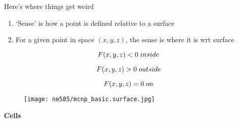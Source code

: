 \documentclass[aspectratio=1610,pdftex,dvipsnames,compress,xcolor={dvipsnames}]{beamer}
\begin{document}
\addtocounter{framenumber}{-1} 
\begin{frame}{Here's where things get weird}
    \begin{enumerate}[series=outerlist,topsep=0pt,itemsep=21pt,leftmargin=*,label=(\arabic*)]
        \item[]`Sense' is how a point is defined relative to a surface
        \item[]For a given point in space $(x,y,z)$, the sense is where it is wrt surface
    \end{enumerate}

    \vspace*{\fill}

    \begin{equation}
        \LARGE
        F(x,y,z) < 0 \; inside
    \end{equation}

    \begin{equation}
        \LARGE
        F(x,y,z) > 0 \; outside
    \end{equation}

    \begin{equation}
        \LARGE
        F(x,y,z) = 0 \; on
    \end{equation}
\end{frame}


\begin{frame}{}
    \begin{figure}
        \centering
        \texttt{[image: ne585/mcnp\_basic.surface.jpg]}
    \end{figure}
\end{frame}


\begin{frame}[plain]{}
    \centering\LARGE\textbf{Cells}
\end{frame}
\end{document}
